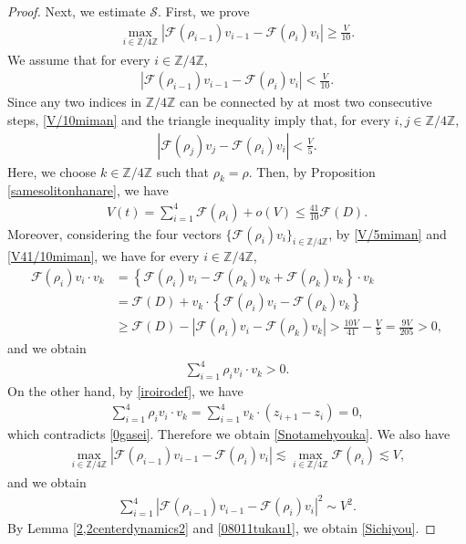 \documentclass[reqno]{amsart}
\theoremstyle{plain}
\theoremstyle{definition}
\numberwithin{equation}{section}
\begin{document}
\begin{proof}
Next, we estimate $\mathcal{S}$. First, we prove 
\begin{align}\label{Snotamehyouka}
\max_{i\in\mathbb{Z}/4\mathbb{Z}}\left|\mathcal{F}(\rho_{i-1})v_{i-1}-\mathcal{F}(\rho_i)v_i\right|\geq \frac{V}{10}.
\end{align}
We assume that for every $i\in\mathbb{Z}/4\mathbb{Z}$,
\begin{align}\label{V/10miman}
\left|\mathcal{F}(\rho_{i-1})v_{i-1}-\mathcal{F}(\rho_i)v_i\right|<\frac{V}{10}.
\end{align}
Since any two indices in $\mathbb{Z}/4\mathbb{Z}$ can be connected by at most two consecutive steps, \eqref{V/10miman} and the triangle inequality imply that, for every $i,j\in\mathbb{Z}/4\mathbb{Z}$,
\begin{align}\label{V/5miman}
\left|\mathcal{F}(\rho_{j})v_{j}-\mathcal{F}(\rho_i)v_i\right|<\frac{V}{5}.
\end{align}
Here, we choose $k\in\mathbb{Z}/4\mathbb{Z}$ such that $\rho_k=\rho$. Then, by Proposition \ref{samesolitonhanare}, we have
\begin{align}\label{V41/10miman}
V(t)=\sum_{i=1}^4\mathcal{F}(\rho_i)+o(V)\leq \frac{41}{10}\mathcal{F}(D).
\end{align}
Moreover, considering the four vectors $\{\mathcal{F}(\rho_i)v_i\}_{i\in\mathbb{Z}/4\mathbb{Z}}$, by \eqref{V/5miman} and \eqref{V41/10miman}, we have for every $i\in\mathbb{Z}/4\mathbb{Z}$,
\begin{align*}
\mathcal{F}(\rho_i)v_i\cdot v_k&=\left\{\mathcal{F}(\rho_i)v_i-\mathcal{F}(\rho_k)v_k+\mathcal{F}(\rho_k)v_k\right\}\cdot v_k
\\
&=\mathcal{F}(D)+v_k\cdot \left\{\mathcal{F}(\rho_i)v_i-\mathcal{F}(\rho_k)v_k\right\}
\\
&\geq \mathcal{F}(D)-\left|\mathcal{F}(\rho_i)v_i-\mathcal{F}(\rho_k)v_k\right|>\frac{10V}{41}-\frac{V}{5}=\frac{9V}{205}>0,
\end{align*}
and we obtain
\begin{align}\label{0gasei}
\sum_{i=1}^4\rho_iv_i\cdot v_k>0.
\end{align}
On the other hand, by \eqref{iroirodef}, we have
\begin{align*}
\sum_{i=1}^4\rho_iv_i\cdot v_k=\sum_{i=1}^4v_k\cdot \left(z_{i+1}-z_i\right)=0,
\end{align*}
which contradicts \eqref{0gasei}. Therefore we obtain \eqref{Snotamehyouka}. We also have
\begin{align*}
\max_{i\in\mathbb{Z}/4\mathbb{Z}}\left|\mathcal{F}(\rho_{i-1})v_{i-1}-\mathcal{F}(\rho_i)v_i\right|\lesssim \max_{i\in\mathbb{Z}/4\mathbb{Z}}\mathcal{F}(\rho_i)\lesssim V,
\end{align*}
and we obtain
\begin{align}\label{08011tukau1}
\sum_{i=1}^4\left|\mathcal{F}(\rho_{i-1})v_{i-1}-\mathcal{F}(\rho_i)v_i\right|^2\sim V^2.
\end{align}
By Lemma \ref{2,2centerdynamics2} and \eqref{08011tukau1}, we obtain \eqref{Sichiyou}.





\end{proof}
\end{document}
